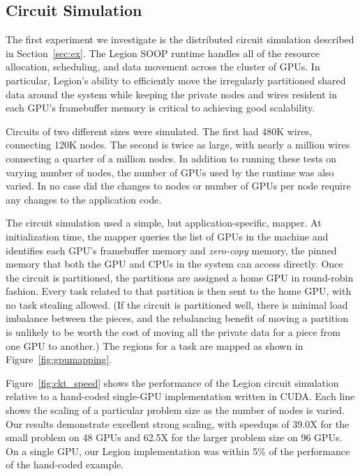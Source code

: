\subsection{Circuit Simulation}
\label{subsec:exp_ckt}

The first experiment we investigate is the distributed circuit simulation described in 
Section~\ref{sec:ex}.  The Legion SOOP runtime handles all of the resource allocation, 
scheduling, and data movement across the cluster of GPUs.  In particular,  
Legion's ability to efficiently move the irregularly partitioned
shared data around the system while keeping the private nodes and wires resident in
each GPU's framebuffer memory is critical to achieving good scalability.

Circuits of two different sizes were simulated.  The first had 480K wires, connecting
120K nodes.  The second is twice as large, with nearly a million wires connecting a
quarter of a million nodes.  In addition to running these tests on varying number of
nodes, the number of GPUs used by the runtime was also varied.  In no case did the 
changes to nodes or number of GPUs per node require any changes to the application code.

The circuit simulation used a simple, but application-specific, mapper.  At initialization
time, the mapper queries the list of GPUs in the machine and identifies each GPU's
framebuffer memory and {\em zero-copy} memory, the pinned memory that both the GPU and
CPUs in the system can access directly.  Once the circuit is partitioned, the partitions
are assigned a home GPU in round-robin fashion.  Every task related to that partition is
then sent to the home GPU, with no task stealing allowed.  (If the circuit is partitioned well,
there is minimal load imbalance between the pieces, and the rebalancing benefit of 
moving a partition is unlikely to be worth the cost of moving all the 
private data for a piece from one GPU to another.)  The regions for a task are mapped as 
shown in Figure~\ref{fig:gpumapping}.

Figure~\ref{fig:ckt_speed} shows the performance of the Legion circuit simulation relative
to a hand-coded single-GPU implementation written in CUDA.  Each line shows the scaling of
a particular problem size as the number of nodes is varied.  Our results demonstrate
excellent strong scaling, with speedups of 39.0X for the small problem on 48 GPUs and 
62.5X for the larger problem size on 96 GPUs.  On a single GPU, our Legion implementation
was within 5\% of the performance of the hand-coded example.

